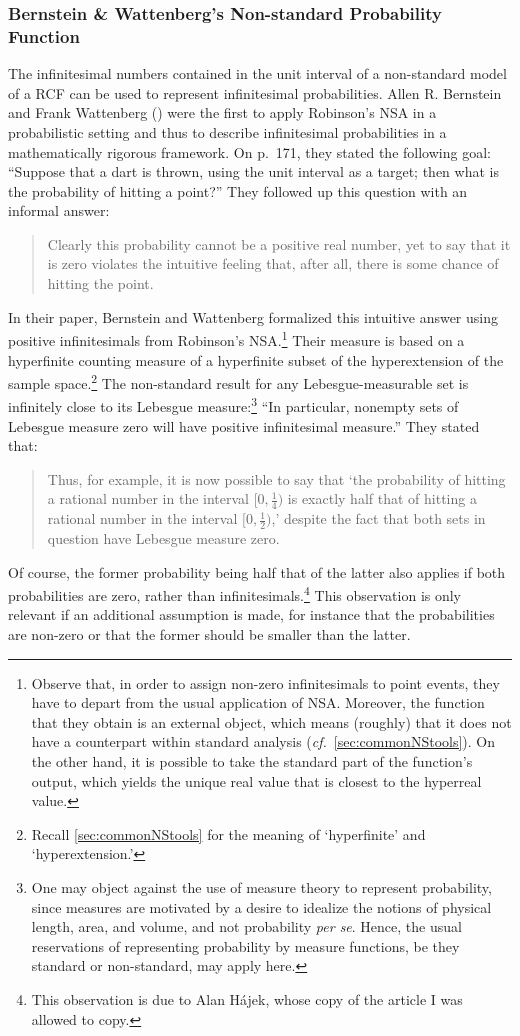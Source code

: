 \subsubsection*{Bernstein \& Wattenberg's Non-standard Probability Function}
The infinitesimal numbers contained in the unit interval of a non-standard model of a RCF can be used to represent infinitesimal probabilities. Allen R. Bernstein and Frank Wattenberg () were the first to apply Robinson's NSA in a probabilistic setting and thus to describe infinitesimal probabilities in a mathematically rigorous framework. On p.~171, they stated the following goal: ``Suppose that a dart is thrown, using the unit interval as a target; then what is the probability of hitting a point?'' They followed up this question with an informal answer:
\begin{quote}
Clearly this probability cannot be a positive real number, yet to say that it is zero violates the intuitive feeling that, after all, there is some chance of hitting the point.
\end{quote}
In their paper, Bernstein and Wattenberg formalized this intuitive answer using positive infinitesimals from Robinson's NSA.\footnote{Observe that, in order to assign non-zero infinitesimals to point events, they have to depart from the usual application of NSA. Moreover, the function that they obtain is an external object, which means (roughly) that it does not have a counterpart within standard analysis (\textit{cf.}\ \autoref{sec:commonNStools}). On the other hand, it is possible to take the standard part of the function's output, which yields the unique real value that is closest to the hyperreal value.}
Their measure is based on a hyperfinite counting measure of a hyperfinite subset of the hyperextension of the sample space.\footnote{Recall \autoref{sec:commonNStools} for the meaning of `hyperfinite' and `hyperextension.'}
The non-standard result for any Lebesgue-measurable set is infinitely close to its Lebesgue measure:\footnote{One may object against the use of measure theory to represent probability, since measures are motivated by a desire to idealize the notions of physical length, area, and volume, and not probability \textit{per se}. Hence, the usual reservations of representing probability by measure functions, be they standard or non-standard, may apply here.} ``In particular, nonempty sets of Lebesgue measure zero will have positive infinitesimal measure.''
They stated that:
\begin{quote}
Thus, for example, it is now possible to say that `the probability of hitting a rational number in the interval $[0,\frac{1}{4})$ is exactly half that of hitting a rational number in the interval  $[0, \frac{1}{2})$,' despite the fact that both sets in question have Lebesgue measure zero.
\end{quote}
Of course, the former probability being half that of the latter also applies if both probabilities are zero, rather than infinitesimals.\footnote{This observation is due to Alan H\'{a}jek, whose copy of the article I was allowed to copy.} This observation is only relevant if an additional assumption is made, for instance that the probabilities are non-zero or that the former should be smaller than the latter.

